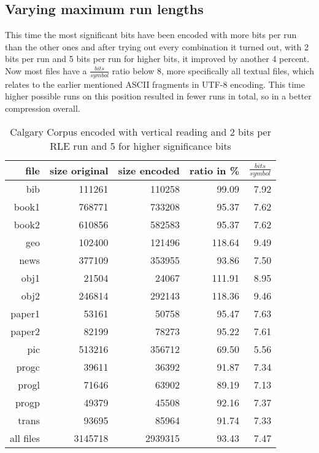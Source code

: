 \subsection{Varying maximum run lengths}
\par{
This time the most significant bits have been encoded with more bits per run than the other ones and after trying out every combination it turned out, with 2 bits per run and 5 bits per run for higher bits, it improved by another 4 percent. Now most files have a $\frac{bits}{symbol}$ ratio below 8, more specifically all textual files, which relates to the earlier mentioned ASCII fragments in UTF-8 encoding. This time higher possible runs on this position resulted in fewer runs in total, so in a better compression overall.

\begin{table}[h]
	\centering
	\begin{tabular}{r|r|r|r|r}	
		file & size original & size encoded & ratio in \% & $\frac{bits}{symbol}$\\
		\hline
		bib & 111261 & 110258 & 99.09 & 7.92\\
		book1 & 768771 & 733208 & 95.37 & 7.62 \\
		book2 & 610856 & 582583 & 95.37 & 7.62\\
		geo & 102400 & 121496 & 118.64 & 9.49\\
		news & 377109 & 353955 & 93.86 & 7.50\\
		obj1 & 21504 & 24067 & 111.91 & 8.95\\
		obj2& 246814 & 292143 & 118.36 & 9.46\\		 
		paper1 & 53161 & 50758 & 95.47 & 7.63\\		 
		paper2& 82199 & 78273 & 95.22 & 7.61\\		 
		pic & 513216 & 356712 & 69.50 & 5.56\\		 
		progc & 39611 & 36392 & 91.87 & 7.34\\		 
		progl & 71646 & 63902 & 89.19 & 7.13\\		 
		progp & 49379 & 45508 & 92.16 & 7.37\\		 
		trans & 93695 & 85964 & 91.74 & 7.33\\
		\hline
		all files & 3145718 & 2939315 & 93.43 & 7.47
	\end{tabular}
	\caption{Calgary Corpus encoded with vertical reading and 2 bits per RLE run and 5 for higher significance bits}
	\label{tab:t42 Calgary Corpus encoded with vertical reading and 2 bits per RLE run and 5 for higher significance bits}
\end{table}	
}

